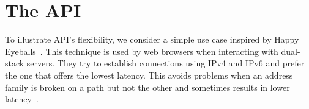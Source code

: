 


\section{The \tcpls API}
\label{appendix:api}

To illustrate \tcpls API's flexibility, we consider a simple
use case inspired by Happy Eyeballs~\cite{rfc8305}. This technique is
used by web browsers when interacting with dual-stack servers. They
try to establish \tcp connections using IPv4 and IPv6 and prefer the
one that offers the lowest latency. This avoids problems when an address
family is broken on a path but not the other and sometimes results in
lower latency~\cite{bajpai2019longitudinal}.


